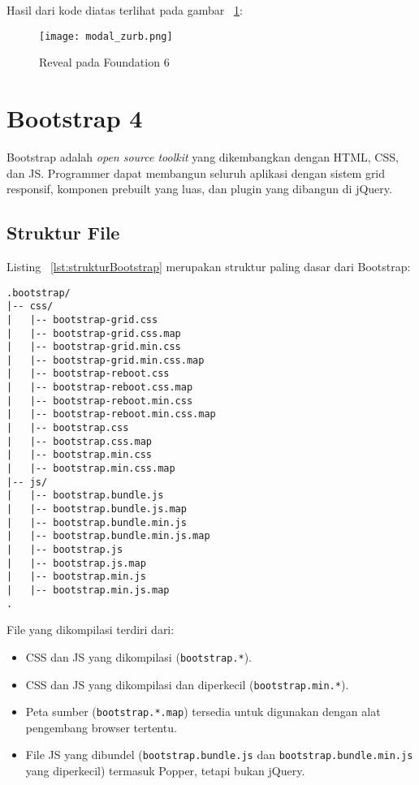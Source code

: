 \noindent Hasil dari kode diatas terlihat pada gambar ~\ref{fig:revealFoundation}:
\begin{figure} [H]
	\centering  
	\texttt{[image: modal\_zurb.png]}  
	\caption{Reveal pada Foundation 6}
	\label{fig:revealFoundation}
\end{figure}

\section{Bootstrap 4}
Bootstrap adalah \textit{open source toolkit} yang dikembangkan dengan HTML, CSS, dan JS. Programmer dapat membangun seluruh aplikasi dengan sistem grid responsif, komponen prebuilt yang luas, dan plugin yang dibangun di jQuery. \cite{bootstrap:19}

\subsection{Struktur File}
Listing ~\ref{lst:strukturBootstrap} merupakan struktur paling dasar dari Bootstrap:
\begin{lstlisting}[basicstyle=\ttfamily, frame=single,
columns=fullflexible, keepspaces=true, breaklines=true, label={lst:strukturBootstrap}, caption=Struktur file pada bootstrap 4]
.bootstrap/
|-- css/
|   |-- bootstrap-grid.css 
|   |-- bootstrap-grid.css.map 
|   |-- bootstrap-grid.min.css
|   |-- bootstrap-grid.min.css.map
|   |-- bootstrap-reboot.css
|   |-- bootstrap-reboot.css.map
|   |-- bootstrap-reboot.min.css
|   |-- bootstrap-reboot.min.css.map
|   |-- bootstrap.css
|   |-- bootstrap.css.map
|   |-- bootstrap.min.css
|   |-- bootstrap.min.css.map
|-- js/
|   |-- bootstrap.bundle.js
|   |-- bootstrap.bundle.js.map
|   |-- bootstrap.bundle.min.js
|   |-- bootstrap.bundle.min.js.map
|   |-- bootstrap.js
|   |-- bootstrap.js.map
|   |-- bootstrap.min.js
|   |-- bootstrap.min.js.map
.
\end{lstlisting}

File yang dikompilasi terdiri dari: 
\begin{itemize}
	\item CSS dan JS yang dikompilasi (\texttt{bootstrap.*}).
	\item CSS dan JS yang dikompilasi dan diperkecil (\texttt{bootstrap.min.*}). \item Peta sumber (\texttt{bootstrap.*.map}) tersedia untuk digunakan dengan alat pengembang browser tertentu. 
	\item File JS yang dibundel (\texttt{bootstrap.bundle.js} dan \texttt{bootstrap.bundle.min.js} yang diperkecil) termasuk Popper, tetapi bukan jQuery.
\end{itemize}

